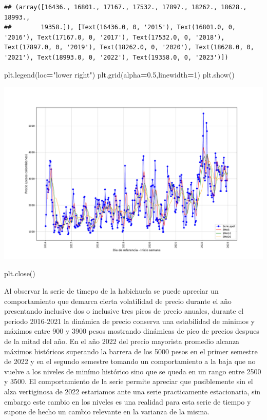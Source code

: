 \documentclass[
]{book}
\newenvironment{Shaded}{\begin{snugshade}}{\end{snugshade}}
\newcommand{\DecValTok}[1]{\textcolor[rgb]{0.00,0.00,0.81}{#1}}
\newcommand{\FloatTok}[1]{\textcolor[rgb]{0.00,0.00,0.81}{#1}}
\newcommand{\NormalTok}[1]{#1}
\newcommand{\OperatorTok}[1]{\textcolor[rgb]{0.81,0.36,0.00}{\textbf{#1}}}
\newcommand{\StringTok}[1]{\textcolor[rgb]{0.31,0.60,0.02}{#1}}
\begin{document}
\begin{verbatim}
## (array([16436., 16801., 17167., 17532., 17897., 18262., 18628., 18993.,
##        19358.]), [Text(16436.0, 0, '2015'), Text(16801.0, 0, '2016'), Text(17167.0, 0, '2017'), Text(17532.0, 0, '2018'), Text(17897.0, 0, '2019'), Text(18262.0, 0, '2020'), Text(18628.0, 0, '2021'), Text(18993.0, 0, '2022'), Text(19358.0, 0, '2023')])
\end{verbatim}

\begin{Shaded}
\begin{Highlighting}[]
\NormalTok{plt.legend(loc}\OperatorTok{=}\StringTok{"lower right"}\NormalTok{)}
\NormalTok{plt.grid(alpha}\OperatorTok{=}\FloatTok{0.5}\NormalTok{,linewidth}\OperatorTok{=}\DecValTok{1}\NormalTok{)}
\NormalTok{plt.show()}
\end{Highlighting}
\end{Shaded}

\includegraphics{bookdown-demo_files/figure-latex/unnamed-chunk-65-29.pdf}

\begin{Shaded}
\begin{Highlighting}[]
\NormalTok{plt.close()}
\end{Highlighting}
\end{Shaded}

Al observar la serie de timepo de la habichuela se puede apreciar un comportamiento que demarca cierta volatilidad de precio durante el año presentando inclusive dos o inclusive tres picos de precio anuales, durante el periodo 2016-2021 la dinámica de precio conserva una estabilidad de minimos y máximos entre 900 y 3900 pesos mostrando dinámicas de pico de precios despues de la mitad del año. En el año 2022 del precio mayorista promedio alcanza máximos históricos superando la barrera de los 5000 pesos en el primer semestre de 2022 y en el segundo semestre tomando un comportamiento a la baja que no vuelve a los niveles de minímo histórico sino que se queda en un rango entre 2500 y 3500. El comportamiento de la serie permite apreciar que posiblemente sin el alza vertiginosa de 2022 estariamos ante una serie practicamente estacionaria, sin embargo este cambio en los niveles es una realidad para esta serie de tiempo y supone de hecho un cambio relevante en la varianza de la misma.
\end{document}
